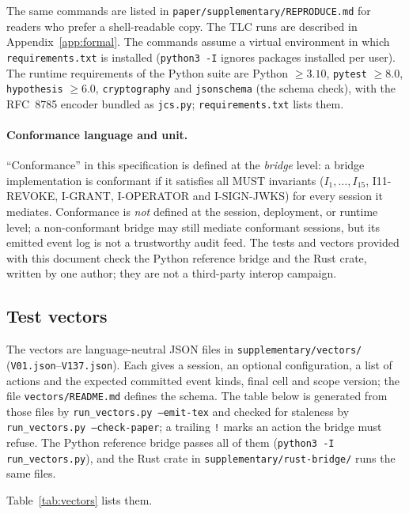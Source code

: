 \noindent The same commands are listed in \texttt{paper/supplementary/REPRODUCE.md}
for readers who prefer a shell-readable copy. The TLC runs are described in
Appendix~\ref{app:formal}. The commands assume a virtual environment in
which \texttt{requirements.txt} is installed (\texttt{python3 -I} ignores
packages installed per user). The runtime requirements of the Python
suite are Python $\geq 3.10$, \texttt{pytest} $\geq 8.0$,
\texttt{hypothesis} $\geq 6.0$, \texttt{cryptography} and
\texttt{jsonschema} (the schema check), with the RFC~8785 encoder bundled
as \texttt{jcs.py}; \texttt{requirements.txt} lists them.

\paragraph{Conformance language and unit.} ``Conformance'' in this
specification is defined at the \emph{bridge} level: a bridge
implementation is conformant if it satisfies all MUST invariants
($I_1, \ldots, I_{15}$, I11-REVOKE, I-GRANT, I-OPERATOR and
I-SIGN-JWKS) for every session it
mediates. Conformance is \emph{not} defined at the session,
deployment, or runtime level; a non-conformant bridge may still
mediate conformant sessions, but its emitted event log is not a
trustworthy audit feed. The tests and vectors provided with this
document check the Python reference bridge and the Rust crate, written by one author; they are not a
third-party interop campaign.

\subsection{Test vectors}\label{sec:test-vectors}

The vectors are language-neutral JSON files in
\texttt{supplementary/vectors/} (\texttt{V01.json}--\texttt{V137.json}).
Each gives a session, an optional configuration, a list of actions and
the expected committed event kinds, final cell and scope version; the
file \texttt{vectors/README.md} defines the schema. The table below is
generated from those files by \texttt{run\_vectors.py --emit-tex} and
checked for staleness by \texttt{run\_vectors.py --check-paper}; a
trailing \texttt{!} marks an action the bridge must refuse. The Python
reference bridge passes all of them (\texttt{python3 -I run\_vectors.py}),
and the Rust crate in \texttt{supplementary/rust-bridge/} runs the same
files.

Table~\ref{tab:vectors} lists them.

